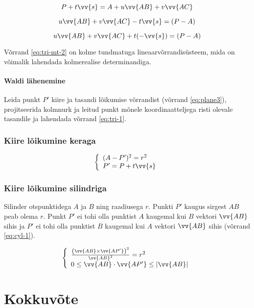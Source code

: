 \documentclass[a4paper,12pt]{report}
\renewcommand{\vec}[1]{\vv{#1}}
\begin{document}
\[P + t\vec s = A + u\vec{AB} + v\vec{AC}\]

\[u\vec{AB} + v\vec{AC} -t\vec s = (P - A)\]

\begin{equation} \label{eq:tri-mt-2}
u\vec{AB} + v\vec{AC} + t(-\vec s) = (P - A)
\end{equation}

Võrrand \ref{eq:tri-mt-2} on kolme tundmatuga lineaarvõrrandisüsteem,
mida on võimalik lahendada kolmerealise determinandiga.

\subsubsection{Waldi lähenemine}
Leida punkt \(P'\) kiire ja tasandi lõikumise võrrandist (võrrand
\ref{eq:plane3}), projitseerida kolmnurk ja leitud punkt mõnele koordinaatteljega
risti olevale tasandile ja lahendada võrrand \ref{eq:tri-1}.

\subsection{Kiire lõikumine keraga}
\begin{equation} \label{eq:sphere1}
\left\{
\begin{array}{l}
(A - P')^2 = r^2 \\
P' = P + t\vec s
\end{array}
\right.
\end{equation}

\subsection{Kiire lõikumine silindriga}
Silinder otspunktidega \(A\) ja \(B\) ning raadiusega \(r\). Punkti \(P'\) kaugus sirgest \(AB\)
peab olema \(r\). Punkt \(P'\) ei tohi olla punktist \(A\) kaugemal kui \(B\) vektori \(\vec{AB}\)
sihis ja \(P'\) ei tohi olla punktist \(B\) kaugemal kui \(A\) vektori \(\vec{AB}\) sihis (võrrand \ref{eq:cyl-1}).

\begin{equation} \label{eq:cyl-1}
\left\{
\begin{array}{l}
\frac{\left(\vec{AB}\times\vec{AP'}\right)^2}{\vec{AB}^2} = r^2 \\
0\leq\vec{AB}\cdot\vec{AP'}\leq|\vec{AB}| 
\end{array}
\right.
\end{equation}

\chapter*{Kokkuvõte}
\end{document}
